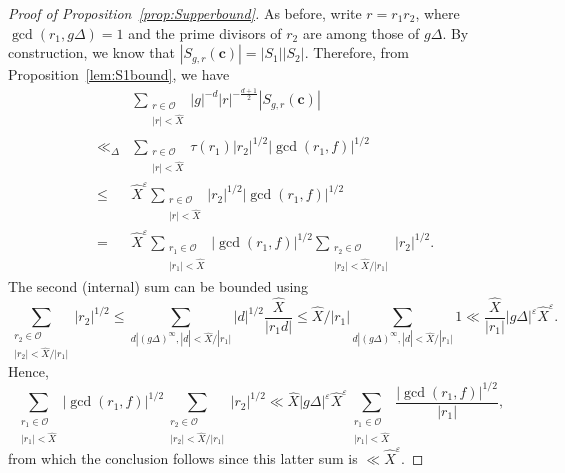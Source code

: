 \documentclass[10pt]{amsart}
\theoremstyle{plain}
\theoremstyle{plain}
\renewcommand{\vec}[1]{\mathbf{#1}}
\theoremstyle{remark}
\theoremstyle{definition}
\renewcommand{\hat}{\widehat}
\begin{document}
\begin{proof}[Proof of Proposition~\ref{prop:Supperbound}] 
As before, write $r=r_1r_2$, where $\gcd(r_1,g\Delta)=1$ and the prime divisors of $r_2$ are among those of $g\Delta$. By construction, we know that $|S_{g,r}(\vec{c})|=|S_1||S_2|$. Therefore, from Proposition~\ref{lem:S1bound}, we have
\begin{eqnarray*}&&\sum_{\substack{r\in\mathcal{O}\\|r|<\hat{X}}}|g|^{-d}|r|^{-\frac{d+1}{2}}|S_{g,r}(\vec{c})|\\&\ll_{\Delta}& \sum_{\substack{r\in\mathcal{O}\\|r|<\hat{X}}}\tau(r_1)|r_2|^{1/2}|\gcd(r_1,f)|^{1/2}\\ &\leq& \hat{X}^{\varepsilon}\sum_{\substack{r\in\mathcal{O}\\|r|<\hat{X}}}|r_2|^{1/2}|\gcd(r_1,f)|^{1/2}\\&=&\hat{X}^{\varepsilon}\sum_{\substack{r_1\in\mathcal{O}\\|r_1|<\hat{X}}}|\gcd(r_1,f)|^{1/2}\sum_{\substack{r_2\in\mathcal{O}\\|r_2|<\hat{X}/|r_1|}}|r_2|^{1/2}.
\end{eqnarray*}
The second (internal) sum can be bounded using
\[\sum_{\substack{r_2\in\mathcal{O}\\|r_2|<\hat{X}/|r_1|}}|r_2|^{1/2}\leq\sum_{d|(g\Delta)^{\infty}, |d|<\hat{X}/|r_1|} |d|^{1/2} \frac{\hat{X}}{|r_1d|} \leq \hat{X}/|r_1|\sum_{d|(g\Delta)^{\infty}, |d|<\hat{X}/|r_1|} 1
 \ll \frac{\hat{X}}{|r_1|}  |g\Delta|^{\varepsilon}\hat{X}^{\varepsilon}.\]
Hence,
\[\sum_{\substack{r_1\in\mathcal{O}\\|r_1|<\hat{X}}}|\gcd(r_1,f)|^{1/2}\sum_{\substack{r_2\in\mathcal{O}\\|r_2|<\hat{X}/|r_1|}}|r_2|^{1/2}\ll \hat{X}|g\Delta|^{\varepsilon}\hat{X}^{\varepsilon}\sum_{\substack{r_1\in\mathcal{O}\\|r_1|<\hat{X}}}\frac{|\gcd(r_1,f)|^{1/2}}{|r_1|},\]
from which the conclusion follows since this latter sum is $\ll \hat{X}^{\varepsilon}$.
\end{proof}
\end{document}
